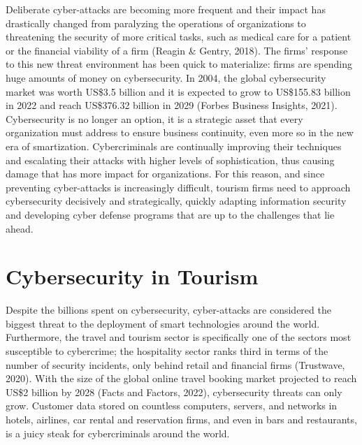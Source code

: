 \documentclass[
  letterpaper,
  DIV=11,
  numbers=noendperiod]{scrreprt}
\begin{document}
Deliberate cyber-attacks are becoming more frequent and their impact has
drastically changed from paralyzing the operations of organizations to
threatening the security of more critical tasks, such as medical care
for a patient or the financial viability of a firm (Reagin \& Gentry,
2018). The firms' response to this new threat environment has been quick
to materialize: firms are spending huge amounts of money on
cybersecurity. In 2004, the global cybersecurity market was worth
US\$3.5 billion and it is expected to grow to US\$155.83 billion in 2022
and reach US\$376.32 billion in 2029 (Forbes Business Insights, 2021).
Cybersecurity is no longer an option, it is a strategic asset that every
organization must address to ensure business continuity, even more so in
the new era of smartization. Cybercriminals are continually improving
their techniques and escalating their attacks with higher levels of
sophistication, thus causing damage that has more impact for
organizations. For this reason, and since preventing cyber-attacks is
increasingly difficult, tourism firms need to approach cybersecurity
decisively and strategically, quickly adapting information security and
developing cyber defense programs that are up to the challenges that lie
ahead.

\hypertarget{cybersecurity-in-tourism}{%
\section{Cybersecurity in Tourism}\label{cybersecurity-in-tourism}}

Despite the billions spent on cybersecurity, cyber-attacks are
considered the biggest threat to the deployment of smart technologies
around the world. Furthermore, the travel and tourism sector is
specifically one of the sectors most susceptible to cybercrime; the
hospitality sector ranks third in terms of the number of security
incidents, only behind retail and financial firms (Trustwave, 2020).
With the size of the global online travel booking market projected to
reach US\$2 billion by 2028 (Facts and Factors, 2022), cybersecurity
threats can only grow. Customer data stored on countless computers,
servers, and networks in hotels, airlines, car rental and reservation
firms, and even in bars and restaurants, is a juicy steak for
cybercriminals around the world.
\end{document}
